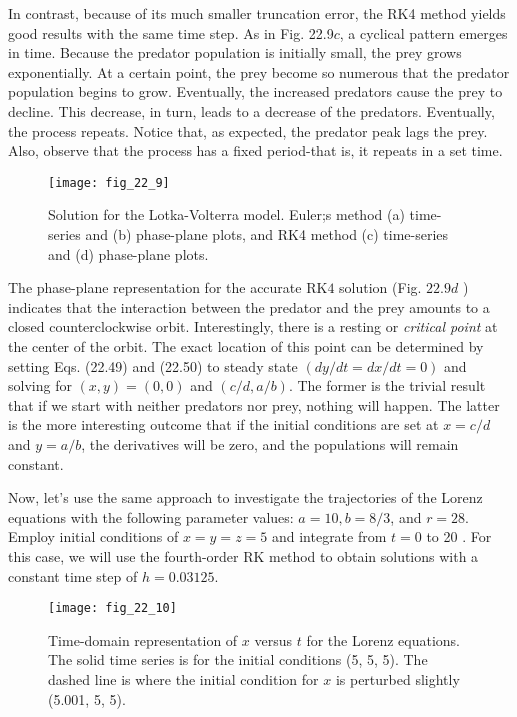 In contrast, because of its much smaller truncation error, the RK4 method yields good results with the same time step. As in Fig. 22.9$c$, a cyclical pattern emerges in time. Because the
predator population is initially small, the prey grows exponentially. At a certain point, the
prey become so numerous that the predator population begins to grow. Eventually, the increased predators cause the prey to decline. This decrease, in turn, leads to a decrease of the
predators. Eventually, the process repeats. Notice that, as expected, the predator peak lags the
prey. Also, observe that the process has a fixed period-that is, it repeats in a set time.

\begin{figure}[H]
    \centering
    \texttt{[image: fig\_22\_9]}
   \caption{\textsf{Solution for the Lotka-Volterra model. Euler;s method (a) time-series and (b) phase-plane plots, and
   RK4 method (c) time-series and (d) phase-plane plots.}}\label{fig:fig_22_9}
\end{figure}

The phase-plane representation for the accurate $\mathrm{RK} 4$ solution (Fig. $22.9 d$ ) indicates that the interaction between the predator and the prey amounts to a closed counterclockwise orbit. Interestingly, there is a resting or \textit{critical point} at the center of the orbit.
The exact location of this point can be determined by setting Eqs. (22.49) and (22.50) to steady state $(d y / d t=d x / d t=0)$ and solving for $(x, y)=(0,0)$ and $(c / d, a / b)$. The former is the trivial result that if we start with neither predators nor prey, nothing will happen. The latter is the more interesting outcome that if the initial conditions are set at $x=c / d$ and $y=a / b$, the derivatives will be zero, and the populations will remain constant.

Now, let's use the same approach to investigate the trajectories of the Lorenz equations with the following parameter values: $a=10, b=8 / 3$, and $r=28$. Employ initial conditions of $x=y=z=5$ and integrate from $t=0$ to 20 . For this case, we will use the fourth-order $\mathrm{RK}$ method to obtain solutions with a constant time step of $h=0.03125$.

\begin{figure}[H]
    \centering
    \texttt{[image: fig\_22\_10]}
   \caption{\textsf{Time-domain representation of $x$ versus $t$ for the Lorenz equations. The solid time series is for the initial conditions (5, 5, 5). The dashed line is where the initial condition for $x$ is perturbed slightly
   (5.001, 5, 5).}}\label{fig:fig_22_10}
\end{figure}

